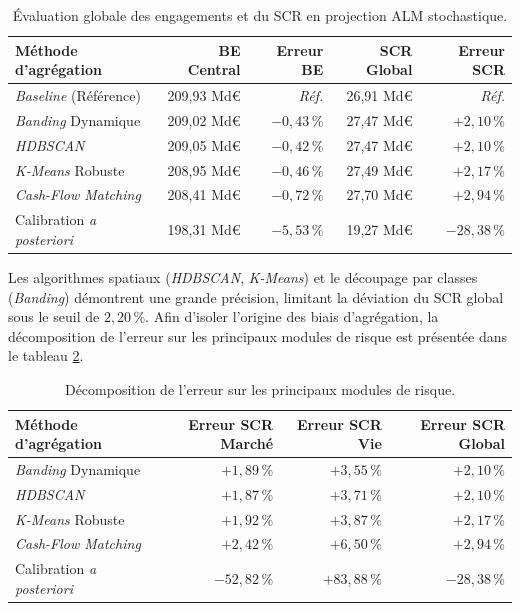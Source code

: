 \begin{table}[H]
    \centering
    \renewcommand{\arraystretch}{1.4}
    \begin{tabular}{|l|r|r|r|r|}
        \hline
        \textbf{Méthode d'agrégation} & \textbf{BE Central} & \textbf{Erreur BE} & \textbf{SCR Global} & \textbf{Erreur SCR} \\
        \hline
        \textit{Baseline} (Référence) & 209{,}93 Md\euro{} & \textit{Réf.} & 26{,}91 Md\euro{} & \textit{Réf.} \\
        \textit{Banding} Dynamique & 209{,}02 Md\euro{} & $-0{,}43\,\%$ & 27{,}47 Md\euro{} & $+2{,}10\,\%$ \\
        \textit{HDBSCAN} & 209{,}05 Md\euro{} & $-0{,}42\,\%$ & 27{,}47 Md\euro{} & $+2{,}10\,\%$ \\
        \textit{K-Means} Robuste & 208{,}95 Md\euro{} & $-0{,}46\,\%$ & 27{,}49 Md\euro{} & $+2{,}17\,\%$ \\
        \textit{Cash-Flow Matching} & 208{,}41 Md\euro{} & $-0{,}72\,\%$ & 27{,}70 Md\euro{} & $+2{,}94\,\%$ \\
        Calibration \textit{a posteriori} & 198{,}31 Md\euro{} & $-5{,}53\,\%$ & 19{,}27 Md\euro{} & $-28{,}38\,\%$ \\
        \hline
    \end{tabular}
    \caption{Évaluation globale des engagements et du SCR en projection ALM stochastique.}
    \label{tab:resultats_central_alm}
\end{table}

Les algorithmes spatiaux (\textit{HDBSCAN}, \textit{K-Means}) et le découpage par classes (\textit{Banding}) démontrent une grande précision, limitant la déviation du SCR global sous le seuil de $2{,}20\,\%$. Afin d'isoler l'origine des biais d'agrégation, la décomposition de l'erreur sur les principaux modules de risque est présentée dans le tableau \ref{tab:resultats_modules}.

\begin{table}[H]
    \centering
    \renewcommand{\arraystretch}{1.4}
    \begin{tabular}{|l|r|r|r|}
        \hline
        \textbf{Méthode d'agrégation} & \textbf{Erreur SCR Marché} & \textbf{Erreur SCR Vie} & \textbf{Erreur SCR Global} \\
        \hline
        \textit{Banding} Dynamique & $+1{,}89\,\%$ & $+3{,}55\,\%$ & $+2{,}10\,\%$ \\
        \textit{HDBSCAN} & $+1{,}87\,\%$ & $+3{,}71\,\%$ & $+2{,}10\,\%$ \\
        \textit{K-Means} Robuste & $+1{,}92\,\%$ & $+3{,}87\,\%$ & $+2{,}17\,\%$ \\
        \textit{Cash-Flow Matching} & $+2{,}42\,\%$ & $+6{,}50\,\%$ & $+2{,}94\,\%$ \\
        Calibration \textit{a posteriori} & $-52{,}82\,\%$ & $+83{,}88\,\%$ & $-28{,}38\,\%$ \\
        \hline
    \end{tabular}
    \caption{Décomposition de l'erreur sur les principaux modules de risque.}
    \label{tab:resultats_modules}
\end{table}

